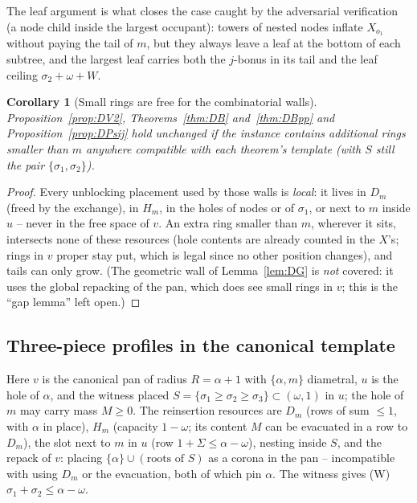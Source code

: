 \documentclass[11pt]{article}
\newtheorem{corollary}[theorem]{Corollary}
\theoremstyle{definition}
\begin{document}
The leaf argument is what closes the case caught by the adversarial
verification (a node child inside the largest occupant): towers of nested
nodes inflate $X_{o_1}$ without paying the tail of $m$, but they always
leave a leaf at the bottom of each subtree, and the largest leaf carries
both the $j$-bonus in its tail and the leaf ceiling
$\sigma_2+\omega+W$.

\begin{corollary}[Small rings are free for the combinatorial walls]
\label{cor:DS}
Proposition~\ref{prop:DV2}, Theorems~\ref{thm:DB} and~\ref{thm:DBpp} and
Proposition~\ref{prop:DPsij} hold unchanged if the instance contains
additional rings smaller than $m$ anywhere compatible with each theorem's
template (with $S$ still the pair $\{\sigma_1,\sigma_2\}$).
\end{corollary}
\begin{proof}
Every unblocking placement used by those walls is \emph{local}: it lives
in $D_m$ (freed by the exchange), in $H_m$, in the holes of nodes or of
$\sigma_1$, or next to $m$ inside $u$ -- never in the free space of $v$.
An extra ring smaller than $m$, wherever it sits, intersects none of
these resources (hole contents are already counted in the $X$'s; rings in
$v$ proper stay put, which is legal since no other position changes), and
tails can only grow. (The geometric wall of Lemma~\ref{lem:DG} is
\emph{not} covered: it uses the global repacking of the pan, which does
see small rings in $v$; this is the ``gap lemma'' left open.)
\end{proof}

\subsection{Three-piece profiles in the canonical template}
\label{app:triple-app}

Here $v$ is the canonical pan of radius $R=\alpha+1$ with $\{\alpha,m\}$
diametral, $u$ is the hole of $\alpha$, and the witness placed
$S=\{\sigma_1\ge\sigma_2\ge\sigma_3\}\subset(\omega,1)$ in $u$; the hole
of $m$ may carry mass $M\ge0$. The reinsertion resources are $D_m$ (rows
of sum $\le1$, with $\alpha$ in place), $H_m$ (capacity $1-\omega$;
its content $M$ can be evacuated in a row to $D_m$), the slot next to $m$
in $u$ (row $1+\Sigma\le\alpha-\omega$), nesting inside $S$, and the
repack of $v$: placing $\{\alpha\}\cup(\text{roots of }S)$ as a corona in
the pan -- incompatible with using $D_m$ or the evacuation, both of which
pin $\alpha$. The witness gives (W) $\sigma_1+\sigma_2\le\alpha-\omega$.
\end{document}
